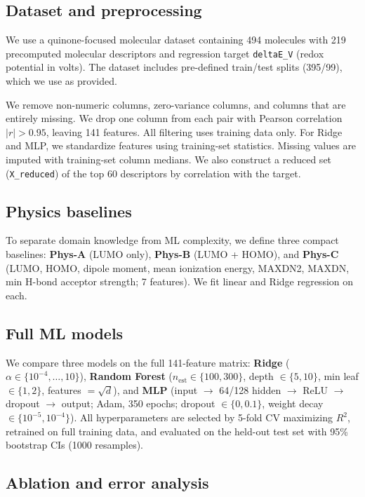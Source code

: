 \documentclass[11pt]{article}
\begin{document}
\subsection{Dataset and preprocessing}

We use a quinone-focused molecular dataset containing 494 molecules with 219 precomputed molecular descriptors and regression target \texttt{deltaE\_V} (redox potential in volts). The dataset includes pre-defined train/test splits (395/99), which we use as provided.

We remove non-numeric columns, zero-variance columns, and columns that are entirely missing. We drop one column from each pair with Pearson correlation $|r| > 0.95$, leaving 141 features. All filtering uses training data only. For Ridge and MLP, we standardize features using training-set statistics. Missing values are imputed with training-set column medians. We also construct a reduced set (\texttt{X\_reduced}) of the top 60 descriptors by correlation with the target.

\subsection{Physics baselines}

To separate domain knowledge from ML complexity, we define three compact baselines: \textbf{Phys-A} (LUMO only), \textbf{Phys-B} (LUMO + HOMO), and \textbf{Phys-C} (LUMO, HOMO, dipole moment, mean ionization energy, MAXDN2, MAXDN, min H-bond acceptor strength; 7 features). We fit linear and Ridge regression on each.

\subsection{Full ML models}

We compare three models on the full 141-feature matrix: \textbf{Ridge} ($\alpha \in \{10^{-4}, \ldots, 10\}$), \textbf{Random Forest} ($n_\text{est} \in \{100, 300\}$, depth $\in \{5, 10\}$, min leaf $\in \{1, 2\}$, features $= \sqrt{d}$), and \textbf{MLP} (input $\to$ 64/128 hidden $\to$ ReLU $\to$ dropout $\to$ output; Adam, 350 epochs; dropout $\in \{0, 0.1\}$, weight decay $\in \{10^{-5}, 10^{-4}\}$). All hyperparameters are selected by 5-fold CV maximizing $R^2$, retrained on full training data, and evaluated on the held-out test set with 95\% bootstrap CIs (1000 resamples).

\subsection{Ablation and error analysis}
\end{document}
